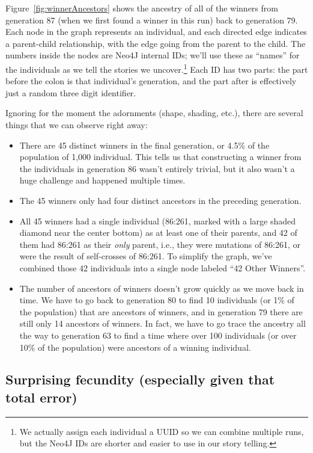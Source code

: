 Figure~\ref{fig:winnerAncestors} shows the ancestry of all of the winners from generation 87 
(when we first found a winner in this run) back to generation 79.
Each node in the graph represents an individual, and each directed edge indicates a parent-child
relationship, with the edge going from the parent to the child. The numbers inside the nodes are
Neo4J internal IDs; we'll use these as ``names'' for the individuals as we tell the stories 
we uncover.\footnote{We actually assign each individual a UUID so we can combine multiple runs, but
	the Neo4J IDs are shorter and easier to use in our story telling.} Each ID has two parts:
the part before the colon is that individual's generation, and the part after is effectively
just a random three digit identifier.

Ignoring for the moment the adornments (shape, shading, etc.), there are several things that
we can observe right away:
\begin{itemize}
	\item There are 45 distinct winners in the final generation, or 4.5\% of the population of
	1,000 individual. This tells us that constructing a winner from the individuals in generation 86
	wasn't entirely trivial, but it also wasn't a huge challenge and happened multiple times.
	\item The 45 winners only had four distinct ancestors in the preceding generation.
	\item All 45 winners had a single individual (86:261, marked with a large shaded diamond near
	the center bottom) as at least one of their parents, and 42 of
	them had 86:261 as their \emph{only} parent, i.e., they were mutations of 86:261, or were the result
	of self-crosses of 86:261. To simplify the graph, we've combined those 42 individuals into a
	single node labeled ``42 Other Winners''.
	\item The number of ancestors of winners doesn't grow quickly as we move back in time. We have to
	go back to generation 80 to find 10 individuals (or 1\% of the population) that are ancestors of
	winners, and in generation 79 there are still only 14 ancestors of winners. In fact, we have to
	go trace the ancestry all the way to generation 63 to find a time where over 100 individuals (or over 10\% of 
	the population) were ancestors of a winning individual.
\end{itemize}

\subsection{Surprising fecundity (especially given that total error)}
\label{sec:surprisingFecundity}

